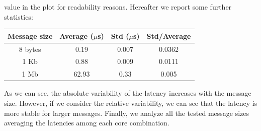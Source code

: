     value in the plot for readability reasons. Hereafter we report
    some further statistics:
    \begin{table}[H]
        \centering
        \begin{tabular}{|c|c|c|c|}
            \hline
            \textbf{Message size} & \textbf{Average ($\mu$s)} & \textbf{Std ($\mu$s)} & \textbf{Std/Average} \\
            \hline
            8 bytes & 0.19 & 0.007 & 0.0362 \\
            1 Kb & 0.88 & 0.009 & 0.0111 \\
            1 Mb & 62.93 & 0.33 & 0.005 \\
            \hline
        \end{tabular}
    \end{table}
    As we can see, the absolute variability of the latency increases
    with the message size. However, if we consider the relative
    variability, we can see that the latency is more stable for larger
    messages.
    Finally, we analyze all the tested message sizes averaging the
    latencies among each core combination.
